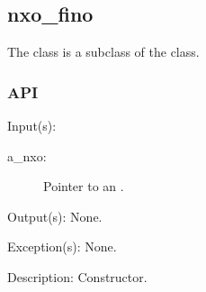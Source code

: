 %
%
%
%
%              

\subsection{nxo\_fino}
\label{nxo_fino}

The  class is a subclass of the  class.

\subsubsection{API}
\begin{capi}
\label{nxo_fino_new}
	\begin{capilist}
	\item[Input(s): ]
		\begin{description}\item[]
		\item[a\_nxo: ]
			Pointer to an .
		\end{description}
	\item[Output(s): ] None.
	\item[Exception(s): ] None.
	\item[Description: ]
		Constructor.
	\end{capilist}
\end{capi}
